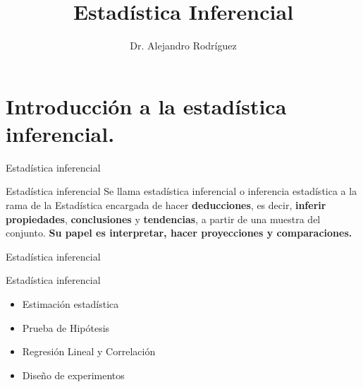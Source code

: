 \documentclass[11pt]{beamer}
\begin{document}
    \author{Dr. Alejandro Rodr\'iguez}
    \title{Estadística Inferencial}
    \begin{frame}[plain]
        \maketitle
    \end{frame}

    \section{Introducción a la estadística inferencial.}
      \begin{frame}{Estadística inferencial}
        \begin{block}{Estadística inferencial}
            Se llama estadística inferencial o inferencia estadística a la rama de la Estadística encargada de hacer \textbf{deducciones}, es decir, \textbf{inferir propiedades}, \textbf{conclusiones} y \textbf{tendencias}, a partir de una muestra del conjunto. \textbf{Su papel es interpretar, hacer proyecciones y comparaciones.}
        \end{block}
      \end{frame}


      \begin{frame}{Estadística inferencial}
          \begin{block}{Estadística inferencial}
              \begin{itemize}
                  \item Estimación estadística
                  \item Prueba de
Hipótesis
                  \item Regresión Lineal y
Correlación
                  \item Diseño de
experimentos
              \end{itemize}
          \end{block}
      \end{frame}
\end{document}
